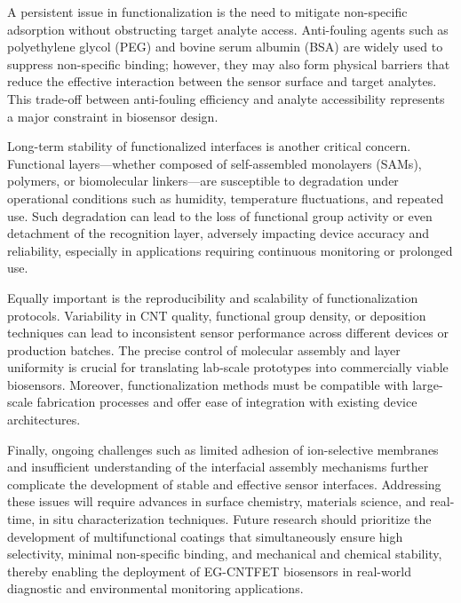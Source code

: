 A persistent issue in functionalization is the need to mitigate non-specific adsorption without obstructing target analyte access. Anti-fouling agents such as polyethylene glycol (PEG) and bovine serum albumin (BSA) are widely used to suppress non-specific binding; however, they may also form physical barriers that reduce the effective interaction between the sensor surface and target analytes. This trade-off between anti-fouling efficiency and analyte accessibility represents a major constraint in biosensor design.

Long-term stability of functionalized interfaces is another critical concern. Functional layers—whether composed of self-assembled monolayers (SAMs), polymers, or biomolecular linkers—are susceptible to degradation under operational conditions such as humidity, temperature fluctuations, and repeated use. Such degradation can lead to the loss of functional group activity or even detachment of the recognition layer, adversely impacting device accuracy and reliability, especially in applications requiring continuous monitoring or prolonged use.

Equally important is the reproducibility and scalability of functionalization protocols. Variability in CNT quality, functional group density, or deposition techniques can lead to inconsistent sensor performance across different devices or production batches. The precise control of molecular assembly and layer uniformity is crucial for translating lab-scale prototypes into commercially viable biosensors. Moreover, functionalization methods must be compatible with large-scale fabrication processes and offer ease of integration with existing device architectures.

Finally, ongoing challenges such as limited adhesion of ion-selective membranes and insufficient understanding of the interfacial assembly mechanisms further complicate the development of stable and effective sensor interfaces. Addressing these issues will require advances in surface chemistry, materials science, and real-time, in situ characterization techniques. Future research should prioritize the development of multifunctional coatings that simultaneously ensure high selectivity, minimal non-specific binding, and mechanical and chemical stability, thereby enabling the deployment of EG-CNTFET biosensors in real-world diagnostic and environmental monitoring applications.
